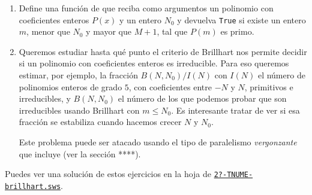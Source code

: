 \begin{ejer}
\begin{enumerate}
\item  Define una funci\'on de {\sage} que reciba como argumentos un polinomio
con coeficientes  enteros $P(x)$ y un entero  $N_0$ y devuelva {\tt True} si
existe un entero  $m$, menor que $N_0$ y mayor que $M+1$,  tal que $P(m)$ es
primo. 
\item Queremos estudiar hasta qu\'e punto el criterio de Brillhart nos permite
decidir si un polinomio con coeficientes enteros es irreducible. Para eso
queremos estimar, por ejemplo, la fracci\'on $B(N,N_0)/I(N)$ con $I(N)$ el
n\'umero de polinomios enteros de grado $5$, con coeficientes entre $-N$ y $N$, 
primitivos e irreducibles,  y $B(N,N_0)$ el n\'umero de los que podemos probar
que son irreducibles usando Brillhart con $m\le N_0$. Es interesante tratar de
ver si esa fracci\'on se estabiliza cuando hacemos crecer $N$ y $N_0$. 

Este problema puede ser atacado usando el tipo de paralelismo {\itshape
vergonzante} que incluye {\sage} (ver la secci\'on ****).

\end{enumerate}

\end{ejer}

Puedes ver una soluci\'on de estos ejercicios en la hoja de {\sage}
\href{http://sage.mat.uam.es:8888/home/pub/?/}{\tt 2?-TNUME-brillhart.sws}.

  
  
  






